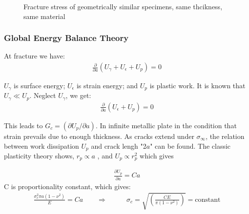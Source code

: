 \documentclass[11pt]{article}
\begin{document}
\begin{figure}[H]
    \centering
    \captionsetup{labelformat=empty}
    \caption{Fracture stress of geometrically similar specimens, same thcikness, same material}
\end{figure}

\subsubsection{Global Energy Balance Theory}
At fracture we have:
\begin{align*}
    \frac{\partial}{\partial a}(U_\gamma + U_\epsilon + U_p) = 0 \tag{6} \label{6}
\end{align*}

$U_\gamma$ is surface energy; $U_\epsilon$ is strain energy; and $U_p$ is plastic work. 
It is known that $U_\gamma \ll U_p$. Neglect $U_\gamma$, we get: 
\begin{align*}
    \frac{\partial}{\partial a}(U_\epsilon + U_p) = 0 \tag{7} \label{7}
\end{align*}

This leads to $G_c = (\partial U_p/\partial a)$. In infinite metallic
plate in the condition that strain prevails due to enough thickness. As
cracks extend under $\sigma_\infty$, the relation between work dissipation $U_p$
and crack lengh "2$a$" can be found. The classic plasticity theory shows, $r_p \propto a$ ,
and $U_p \propto r_{p} ^{2}$ which gives

\begin{align*}
    \frac{\partial U_p}{\partial a} = Ca
\end{align*}
C is proportionality constant, which gives:
\begin{align}
    \frac{\sigma_{c}^{2} \pi a (1 - \nu ^ 2)}{E} = Ca \qquad
\Rightarrow \qquad &\sigma_c = \sqrt{(\frac{CE}{\pi (1 - \nu ^ 2)})} = \text{constant} \nonumber
\end{align}
\end{document}
